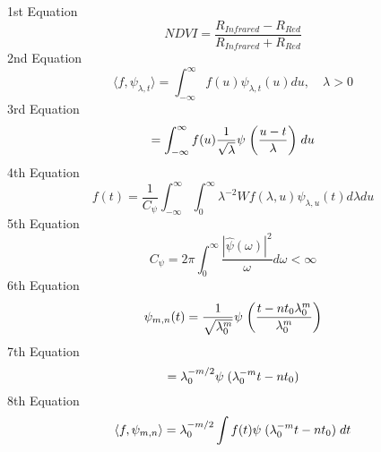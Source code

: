\documentclass{article}
\begin{document}
\vspace{1cm} 1st Equation\\
\begin{equation} NDVI=\frac{R_{Infrared}-R_{Red}}{R_{Infrared}+R_{Red}}
\end{equation}
\vspace{1cm} \hspace{3mm} 2nd Equation\\
\begin{equation} \langle f,\psi_{\lambda,t} \rangle = \int_{-\infty}^{\infty} f(u)\psi_{\lambda,t}(u)du, \quad \lambda > 0
\end{equation}
\vspace{1cm} \hspace{3mm} 3rd Equation\\
\begin{equation} = \int_{-\infty}^{\infty} f(u)\frac{1}{\sqrt{\lambda}}\psi \hspace{0.1cm} \bigg(\frac{u-t}{\lambda} \bigg) \hspace{0.1cm} du
\end{equation}
\vspace{1cm} \hspace{3mm} 4th Equation\\
\begin{equation} f(t) = \frac{1}{C_{\psi}} \int_{-\infty}^{\infty} \int_{0}^{\infty} \lambda^{-2}Wf(\lambda,u)\psi_{\lambda,u}(t)d\lambda du
\end{equation}
\vspace{1cm} \hspace{3mm} 5th Equation\\
\begin{equation} C_{\psi} = 2\pi \int_{0}^{\infty} \frac{|\hat{\psi}(\omega)|^2}{\omega}d\omega < \infty
\end{equation}
\vspace{1cm} \hspace{3mm} 6th Equation\\
\begin{equation} \psi_{m,n}(t) = \frac{1}{\sqrt{\lambda_{0}^{m}}}\psi \hspace{0.1cm} \bigg(\frac{t-nt_{0}\lambda_{0}^{m}}{\lambda_{0}^{m}} \bigg)
\end{equation}
\vspace{1cm} \hspace{3mm} 7th Equation\\
\begin{equation} = \lambda_{0}^{-m/2}\psi \hspace{0.1cm} (\lambda_{0}^{-m}t-nt_{0})
\end{equation}
\vspace{1cm} \hspace{3mm} 8th Equation\\
\begin{equation} \langle f,\psi_{m,n} \rangle = \lambda_{0}^{-m/2} \int f(t)\psi \hspace{0.1cm} (\lambda_{0}^{-m}t-nt_{0}) \hspace{0.1cm} dt
\end{equation}
\end{document}
